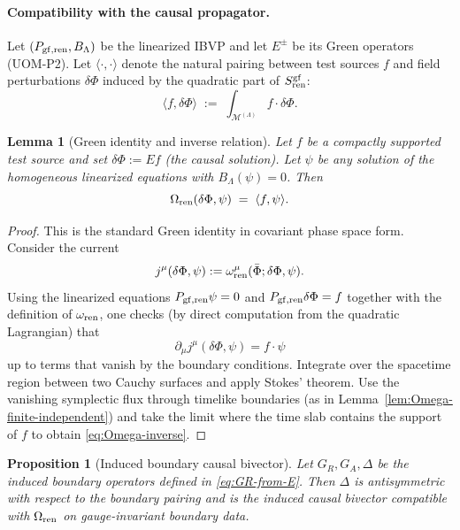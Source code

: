 \documentclass[10pt]{article}
\theoremstyle{definition}
\theoremstyle{plain}
\newtheorem{lemma}{Lemma}[section]
\newtheorem{proposition}{Proposition}[section]
\begin{document}
\paragraph{Compatibility with the causal propagator.}
Let $(P_{\rm gf,ren},B_\Lambda)$ be the linearized IBVP and let $E^\pm$ be its Green operators (UOM-P2).
Let $\langle\cdot,\cdot\rangle$ denote the natural pairing between test sources $f$ and field perturbations $\delta\Phi$
induced by the quadratic part of $S_{\rm ren}^{\rm gf}$:
\[
\langle f,\delta\Phi\rangle \;:=\; \int_{\mathcal M^{(\Lambda)}} f\cdot \delta\Phi.
\]

\begin{lemma}[Green identity and inverse relation]
\label{lem:Omega-inverts-E}
Let $f$ be a compactly supported test source and set $\delta\Phi:=E f$ (the causal solution).  Let $\psi$ be any solution of the homogeneous
linearized equations with $B_\Lambda(\psi)=0$. Then
\begin{equation}
\Omega_{\rm ren}(\delta\Phi,\psi)\;=\;\langle f,\psi\rangle.
\label{eq:Omega-inverse}
\end{equation}
\end{lemma}

\begin{proof}
This is the standard Green identity in covariant phase space form.
Consider the current
\[
j^\mu(\delta\Phi,\psi):=\omega_{\rm ren}^\mu(\bar\Phi;\delta\Phi,\psi).
\]
Using the linearized equations $P_{\rm gf,ren}\psi=0$ and $P_{\rm gf,ren}\delta\Phi=f$ together with the definition of $\omega_{\rm ren}$,
one checks (by direct computation from the quadratic Lagrangian) that
\[
\partial_\mu j^\mu(\delta\Phi,\psi)= f\cdot \psi
\]
up to terms that vanish by the boundary conditions. Integrate over the spacetime region between two Cauchy surfaces and apply Stokes' theorem.
Use the vanishing symplectic flux through timelike boundaries (as in Lemma~\ref{lem:Omega-finite-independent}) and take the limit where the
time slab contains the support of $f$ to obtain \eqref{eq:Omega-inverse}.
\end{proof}

\begin{proposition}[Induced boundary causal bivector]
\label{prop:boundary-bivector}
Let $G_R,G_A,\Delta$ be the induced boundary operators defined in \eqref{eq:GR-from-E}.  Then $\Delta$ is antisymmetric with respect to the
boundary pairing and is the induced causal bivector compatible with $\Omega_{\rm ren}$ on gauge-invariant boundary data.
\end{proposition}
\end{document}

